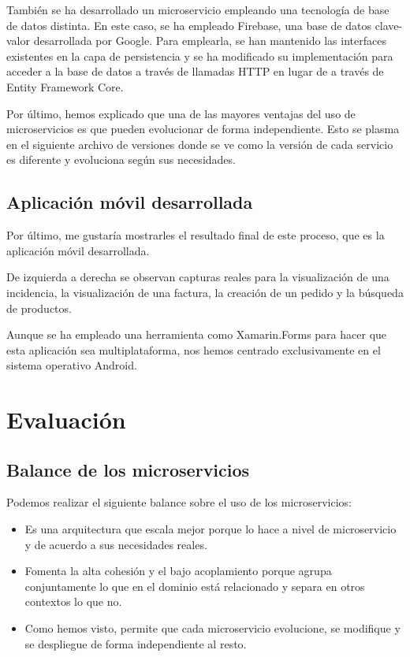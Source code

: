 \documentclass[11pt,a4paper]{article}
\begin{document}
También se ha desarrollado un microservicio empleando una tecnología de base de datos distinta. En este caso, se ha empleado Firebase, una base de datos clave-valor desarrollada por Google. Para emplearla, se han mantenido las interfaces existentes en la capa de persistencia y se ha modificado su implementación para acceder a la base de datos a través de llamadas HTTP en lugar de a través de Entity Framework Core.

Por último, hemos explicado que una de las mayores ventajas del uso de microservicios es que pueden evolucionar de forma independiente. Esto se plasma en el siguiente archivo de versiones donde se ve como la versión de cada servicio es diferente y evoluciona según sus necesidades.

\subsection{Aplicación móvil desarrollada}

Por último, me gustaría mostrarles el resultado final de este proceso, que es la aplicación móvil desarrollada.

De izquierda a derecha se observan capturas reales para la visualización de una incidencia, la visualización de una factura, la creación de un pedido y la búsqueda de productos.

Aunque se ha empleado una herramienta como Xamarin.Forms para hacer que esta aplicación sea multiplataforma, nos hemos centrado exclusivamente en el sistema operativo Android.

\section{Evaluación}

\subsection{Balance de los microservicios}

Podemos realizar el siguiente balance sobre el uso de los microservicios:

\begin{itemize}

\item Es una arquitectura que escala mejor porque lo hace a nivel de microservicio y de acuerdo a sus necesidades reales.

\item Fomenta la alta cohesión y el bajo acoplamiento porque agrupa conjuntamente lo que en el dominio está relacionado y separa en otros contextos lo que no.

\item Como hemos visto, permite que cada microservicio evolucione, se modifique y se despliegue de forma independiente al resto.

\end{itemize}
\end{document}
